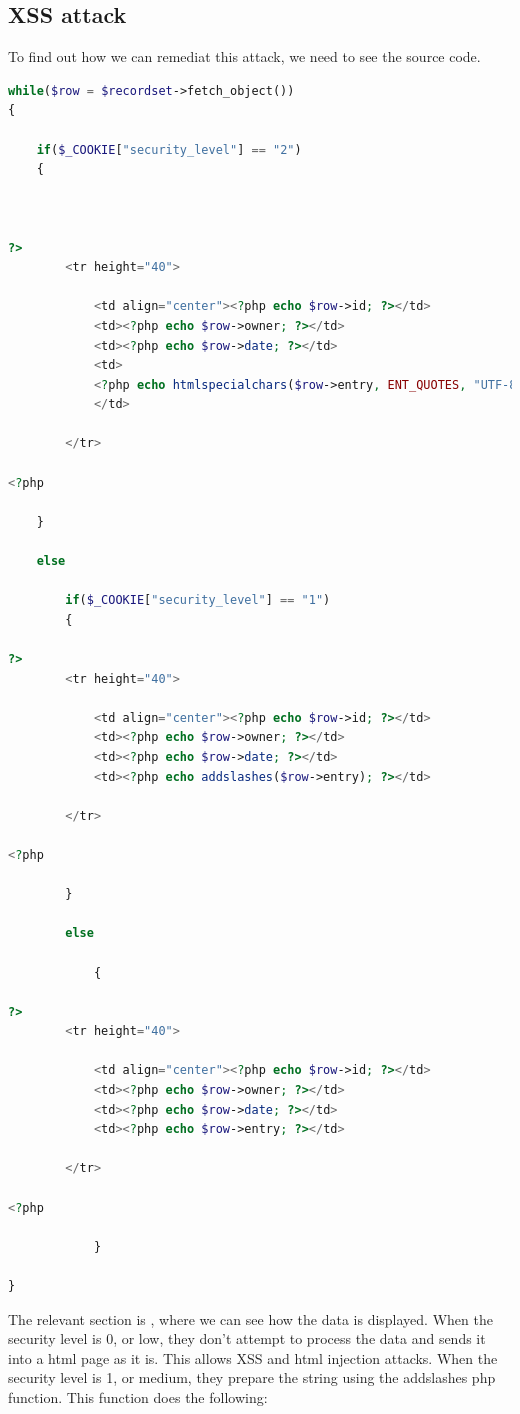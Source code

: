 \documentclass{article}
\begin{document}
\subsection{XSS attack}
\label{xss-attack}
To find out how we can remediat this attack, we need to see the source code.


\begin{lstlisting}[language=php, caption={XSS Code},label=php:xss-attack]
while($row = $recordset->fetch_object())
{

    if($_COOKIE["security_level"] == "2")
    {



?>
        <tr height="40">

            <td align="center"><?php echo $row->id; ?></td>
            <td><?php echo $row->owner; ?></td>
            <td><?php echo $row->date; ?></td>
            <td>
            <?php echo htmlspecialchars($row->entry, ENT_QUOTES, "UTF-8"); ?>
            </td>

        </tr>

<?php

    }

    else
        
        if($_COOKIE["security_level"] == "1")
        {

?>
        <tr height="40">

            <td align="center"><?php echo $row->id; ?></td>
            <td><?php echo $row->owner; ?></td>
            <td><?php echo $row->date; ?></td>
            <td><?php echo addslashes($row->entry); ?></td>

        </tr>

<?php

        }
        
        else        

            {

?>
        <tr height="40">

            <td align="center"><?php echo $row->id; ?></td>
            <td><?php echo $row->owner; ?></td>
            <td><?php echo $row->date; ?></td>
            <td><?php echo $row->entry; ?></td>

        </tr>

<?php          

            }

}
\end{lstlisting}

The relevant section is \label{php:xss-attack}, where we can see how the data is displayed.
When the security level is 0, or low, they don't attempt to process the data and sends it into a html page as it is. This allows XSS and html injection attacks.
When the security level is 1, or medium, they prepare the string using the addslashes php function.
This function does the following:
\end{document}
